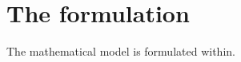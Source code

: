 \section{The formulation}
\label{formulation}

The mathematical model is formulated within. \cite{Holzapfel:2009bb}

%

